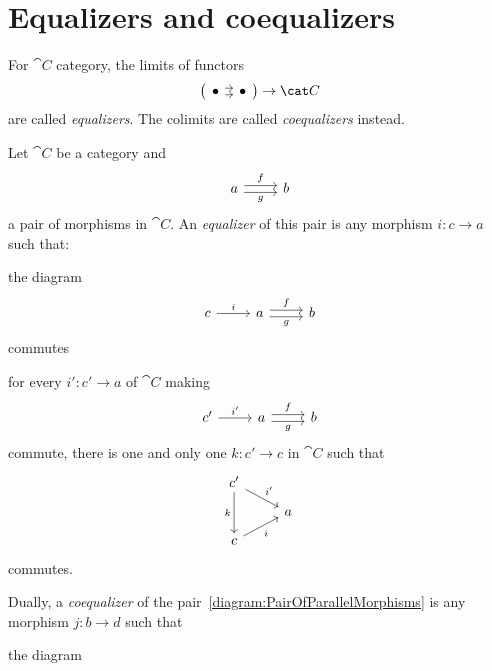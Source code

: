 
\section{Equalizers and coequalizers}

For \(\cat C\) category, the limits of functors
\[\left(\begin{tikzcd}[column sep=tiny] \bullet \ar[r, shift left] \ar[r,
      shift right] & \bullet \end{tikzcd}\right) \to \cat C\] are called {\em
  equalizers}. The colimits are called {\em coequalizers} instead.

\begin{definition}
  Let \(\cat C\) be a category and
  \begin{equation}\begin{tikzcd}
      a \ar["f", r, shift left] \ar["g", r, shift right, swap] & b
    \end{tikzcd}\label{diagram:PairOfParallelMorphisms}\end{equation}
  a pair of morphisms in \(\cat C\). An {\em equalizer} of this pair
  is any morphism \(i : c \to a\) such that:
  \begin{tcbitem}
  \item the diagram
    \[\begin{tikzcd}
        c \ar["i", r] & a \ar["f", r, shift left] \ar["g", r, shift
        right, swap] & b
      \end{tikzcd}\] commutes
  \item for every \(i' : c' \to a\) of \(\cat C\) making
    \[\begin{tikzcd}
        c' \ar["{i'}", r] & a \ar["f", r, shift left] \ar["g", r,
        shift right, swap] & b
      \end{tikzcd}\] commute, there is one and only one
    \(k : c' \to c\) in \(\cat C\) such that
    \[\begin{tikzcd}[row sep=small]
        c' \ar["{i'}", dr] \ar["k", dd, swap] \\
        & a \\
        c \ar["i", ur, swap]
      \end{tikzcd}\] commutes.
  \end{tcbitem}
%
  Dually, a {\em coequalizer} of the
  pair~\eqref{diagram:PairOfParallelMorphisms} is any morphism
  \(j : b \to d\) such that
  \begin{tcbitem}
  \item the diagram
    \[\begin{tikzcd}

\end{tikzcd}\]
\end{tcbitem}
\end{definition}
